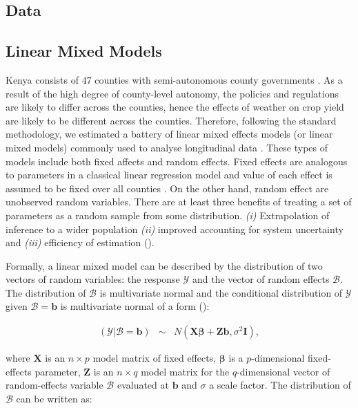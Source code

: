 \documentclass[a4paper,12pt]{article}
\begin{document}
\subsection{Data}

\subsection{Linear Mixed Models}
\sloppy
Kenya consists of $47$ counties with semi-autonomous county governments  \citep{Barasa2017}. As a result of the high degree of county-level autonomy, the policies and regulations are likely to differ across the counties, hence the effects of weather on crop yield are likely to be different across the counties. Therefore, following the standard methodology, we estimated a battery of linear mixed effects models (or linear mixed models) commonly used to analyse longitudinal data \citep{bates2000mixed}. These types of models include both fixed affects and random effects. Fixed effects are analogous to parameters in a classical linear regression model and value of each effect is assumed to be fixed over all counties \citep{bates2010lme4}. On the other hand, random effect are unobserved random variables. There are at least three benefits of treating a set of parameters as a random sample from some distribution. \textit{(i)} Extrapolation of inference to a wider population \textit{(ii)} improved accounting for system uncertainty and \textit{(iii)} efficiency of estimation (\citealp{KERYch9,KERYch12}).

Formally, a linear mixed model can be described by the distribution of two vectors of random variables: the response $\mathscr{Y}$ and the vector of random effects $\mathscr{B}$. The distribution of $\mathscr{B}$ is multivariate normal and the conditional distribution of $\mathscr{Y}$ given $\mathscr{B}=\mathbf{b}$ is multivariate normal of a form (\citealp{bates2010lme4, KERYch9}):




\begin{equation}\label{MixedGeneral}
\begin{array}{lcl}

(\mathscr{Y}|\mathscr{B}=\mathbf{b})& \sim & \mathit{N}(\mathbf{X}\mathbf{\beta}+\mathbf{Z}\mathbf{b},\sigma^2\mathbf{I}),

\end{array}
\end{equation}

where $\mathbf{X}$ is an $n \times p$ model matrix of fixed effects, $\mathbf{\beta}$ is a $p$-dimensional fixed-effects parameter, $\mathbf{Z}$ is an $n \times q$ model matrix for the $q$-dimensional vector of random-effects variable $\mathscr{B}$ evaluated at $\mathbf{b}$ and $\sigma$ a scale factor. The distribution of $\mathscr{B}$ can be written as: 
\end{document}
